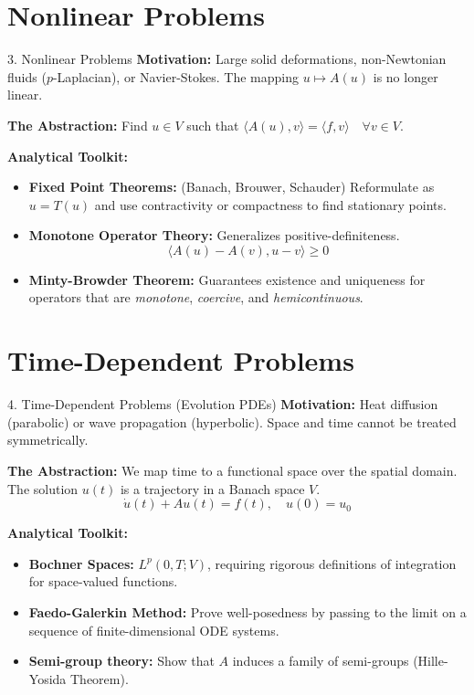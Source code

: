 \documentclass[aspectratio=169]{beamer}
\begin{document}
\section{Nonlinear Problems}
\begin{frame}{3. Nonlinear Problems}
    \textbf{Motivation:} Large solid deformations, non-Newtonian fluids ($p$-Laplacian), or  Navier-Stokes. The mapping $u \mapsto A(u)$ is no longer linear.

    \vspace{0.2cm}
    \textbf{The Abstraction:}
    Find $u \in V$ such that $\langle A(u), v \rangle = \langle f, v \rangle \quad \forall v \in V$.

    \vspace{0.2cm}
    \textbf{Analytical Toolkit:}
    \begin{itemize}
        \item \textbf{Fixed Point Theorems:} (Banach, Brouwer, Schauder) Reformulate as $u = T(u)$ and use contractivity or compactness to find stationary points.
        \item \textbf{Monotone Operator Theory:} Generalizes positive-definiteness. 
        $$ \langle A(u) - A(v), u - v \rangle \ge 0 $$
    \item \textbf{Minty-Browder Theorem:} Guarantees existence and uniqueness for operators that are \emph{monotone}, \emph{coercive}, and \emph{hemicontinuous}.
    \end{itemize}
\end{frame}

\section{Time-Dependent Problems}
\begin{frame}{4. Time-Dependent Problems (Evolution PDEs)}
    \textbf{Motivation:} Heat diffusion (parabolic) or wave propagation (hyperbolic). Space and time cannot be treated symmetrically.

    \vspace{0.2cm}
    \textbf{The Abstraction:}
    We map time to a functional space over the spatial domain. The solution $u(t)$ is a trajectory in a Banach space $V$.
    $$ \dot{u}(t) + Au(t) = f(t), \quad u(0) = u_0 $$

    \vspace{0.2cm}
    \textbf{Analytical Toolkit:}
    \begin{itemize}
        \item \textbf{Bochner Spaces:} $L^p(0,T; V)$, requiring rigorous definitions of integration for space-valued functions.
        \item \textbf{Faedo-Galerkin Method:} Prove well-posedness by passing to the limit on a sequence of finite-dimensional ODE systems.
        \item \textbf{Semi-group theory:} Show that $A$ induces a family of semi-groups (Hille-Yosida Theorem).
    \end{itemize}
\end{frame}
\end{document}
